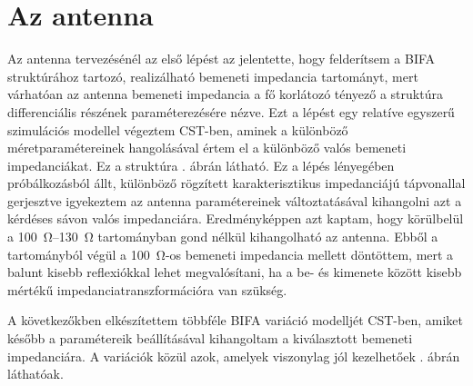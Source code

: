 \section{Az antenna}
	Az antenna tervezésénél az első lépést az jelentette, hogy felderítsem a BIFA struktúrához tartozó, realizálható bemeneti impedancia tartományt, mert várhatóan az antenna bemeneti impedancia a fő korlátozó tényező a struktúra differenciális részének paraméterezésére nézve. Ezt a lépést egy relatíve egyszerű szimulációs modellel végeztem CST-ben, aminek a különböző méretparamétereinek hangolásával értem el a különböző valós bemeneti impedanciákat. Ez a struktúra . ábrán látható.
Ez a lépés lényegében próbálkozásból állt, különböző rögzített karakterisztikus impedanciájú tápvonallal gerjesztve igyekeztem az antenna paramétereinek változtatásával kihangolni azt a kérdéses sávon valós impedanciára. Eredményképpen azt kaptam, hogy körülbelül a \SIrange{100}{130}{\ohm} tartományban gond nélkül kihangolható az antenna. Ebből a tartományból végül a \SI{100}{\ohm}-os bemeneti impedancia mellett döntöttem, mert a balunt kisebb reflexiókkal lehet megvalósítani, ha a be- és kimenete között kisebb mértékű impedanciatranszformációra van szükség.
\par A következőkben elkészítettem többféle BIFA variáció modelljét CST-ben, amiket később a paramétereik beállításával kihangoltam a kiválasztott bemeneti impedanciára. A variációk közül azok, amelyek viszonylag jól kezelhetőek . ábrán láthatóak.
